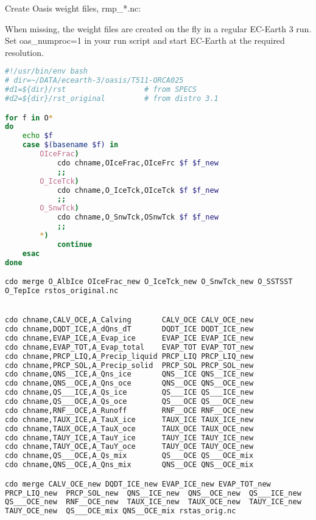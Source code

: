 Create Oasis weight files, rmp\_*.nc:

When missing, the weight files are created on the fly in a regular EC-Earth 3 run. Set oas\_numproc=1 in your run script and start EC-Earth at the required resolution.

\begin{lstlisting}[caption={Compilation functions},label={app:comp},language=Bash]
#!/usr/bin/env bash
# dir=~/DATA/ecearth-3/oasis/T511-ORCA025
#d1=${dir}/rst                  # from SPECS
#d2=${dir}/rst_original         # from distro 3.1

for f in O*
do
    echo $f
    case $(basename $f) in
        OIceFrac)
            cdo chname,OIceFrac,OIceFrc $f $f_new
            ;;
        O_IceTck)
            cdo chname,O_IceTck,OIceTck $f $f_new
            ;;
        O_SnwTck)
            cdo chname,O_SnwTck,OSnwTck $f $f_new
            ;;
        *)
            continue
    esac
done

cdo merge O_AlbIce OIceFrac_new O_IceTck_new O_SnwTck_new O_SSTSST
O_TepIce rstos_original.nc


cdo chname,CALV_OCE,A_Calving       CALV_OCE CALV_OCE_new
cdo chname,DQDT_ICE,A_dQns_dT       DQDT_ICE DQDT_ICE_new
cdo chname,EVAP_ICE,A_Evap_ice      EVAP_ICE EVAP_ICE_new
cdo chname,EVAP_TOT,A_Evap_total    EVAP_TOT EVAP_TOT_new
cdo chname,PRCP_LIQ,A_Precip_liquid PRCP_LIQ PRCP_LIQ_new
cdo chname,PRCP_SOL,A_Precip_solid  PRCP_SOL PRCP_SOL_new
cdo chname,QNS__ICE,A_Qns_ice       QNS__ICE QNS__ICE_new
cdo chname,QNS__OCE,A_Qns_oce       QNS__OCE QNS__OCE_new
cdo chname,QS___ICE,A_Qs_ice        QS___ICE QS___ICE_new
cdo chname,QS___OCE,A_Qs_oce        QS___OCE QS___OCE_new
cdo chname,RNF__OCE,A_Runoff        RNF__OCE RNF__OCE_new
cdo chname,TAUX_ICE,A_TauX_ice      TAUX_ICE TAUX_ICE_new
cdo chname,TAUX_OCE,A_TauX_oce      TAUX_OCE TAUX_OCE_new
cdo chname,TAUY_ICE,A_TauY_ice      TAUY_ICE TAUY_ICE_new
cdo chname,TAUY_OCE,A_TauY_oce      TAUY_OCE TAUY_OCE_new
cdo chname,QS___OCE,A_Qs_mix        QS___OCE QS___OCE_mix
cdo chname,QNS__OCE,A_Qns_mix       QNS__OCE QNS__OCE_mix

cdo merge CALV_OCE_new DQDT_ICE_new EVAP_ICE_new EVAP_TOT_new
PRCP_LIQ_new  PRCP_SOL_new  QNS__ICE_new  QNS__OCE_new  QS___ICE_new 
QS___OCE_new  RNF__OCE_new  TAUX_ICE_new  TAUX_OCE_new  TAUY_ICE_new 
TAUY_OCE_new  QS___OCE_mix QNS__OCE_mix rstas_orig.nc
\end{lstlisting}


\printglossaries
